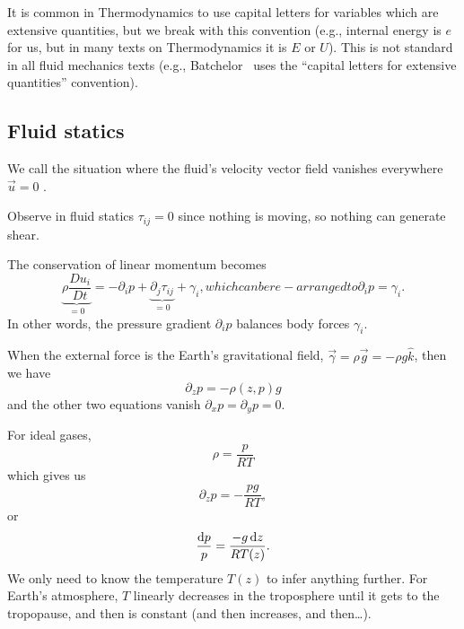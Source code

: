 \begin{caution}
It is common in Thermodynamics to use capital letters for variables
which are extensive quantities, but we break with this convention
(e.g., internal energy is $e$ for us, but in many texts on
Thermodynamics it is $E$ or $U$). This is not standard in all fluid
mechanics texts (e.g., Batchelor~\cite{batchelor1973introduction} uses
the ``capital letters for extensive quantities'' convention).
\end{caution}

\subsection{Fluid statics}

\begin{definition}
We call the situation where the fluid's velocity vector field vanishes
everywhere $\vec{u}=0$ .
\end{definition}

\begin{node}
Observe in fluid statics $\tau_{ij}=0$ since nothing is moving, so
nothing can generate shear.
\end{node}

\begin{node}
The conservation of linear momentum becomes
\begin{subequations}
\begin{equation}
\underbrace{\rho\frac{D u_{i}}{D t}}_{=0} = -\partial_{i}p+\underbrace{\partial_{j}\tau_{ij}}_{=0}+\gamma_{i},
\end{equation}
which can be re-arranged to
\begin{equation}
\partial_{i}p=\gamma_{i}.
\end{equation}
\end{subequations}
In other words, the pressure gradient $\partial_{i}p$ balances body
forces $\gamma_{i}$.
\end{node}

\begin{node}
When the external force is the Earth's gravitational field,
$\vec{\gamma}=\rho\vec{g}=-\rho g\widehat{k}$, then we have
\begin{equation}
\partial_{z}p=-\rho(z,p) g
\end{equation}
and the other two equations vanish $\partial_{x}p=\partial_{y}p=0$.
\end{node}

\begin{node}
For ideal gases,
\begin{equation}
\rho=\frac{p}{RT}
\end{equation}
which gives us
\begin{equation}
\partial_{z}p=-\frac{pg}{RT},
\end{equation}
or
\begin{equation}
\frac{\mathrm{d} p}{p}=\frac{-g\,\mathrm{d} z}{RT(z)}.
\end{equation}
We only need to know the temperature $T(z)$ to infer anything
further. For Earth's atmosphere, $T$ linearly decreases in the
troposphere until it gets to the tropopause, and then is constant (and
then increases, and then\dots).
\end{node}


